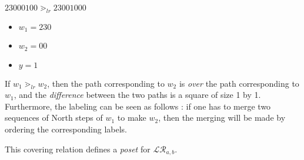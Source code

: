\begin{example}[$a < b : a = 3, b = 5$, third case]
    $23000100 \gtrdot_{lr} 23001000$
    \begin{itemize}
        \item $w_1 = 230$
        \item $w_2 = 00$
        \item $y = 1$
    \end{itemize}
\end{example}

\begin{rem}
    If $w_1 \gtrdot_{lr} w_2$, then the path corresponding to
    $w_2$ is \emph{over} the path corresponding to $w_1$,
    and the \emph{difference} between the two paths is a
    square of size 1 by 1.\\
    Furthermore, the labeling can be seen as follows :
    if one has to merge two sequences of North steps of $w_1$
    to make $w_2$, then the merging will be made by ordering the
    corresponding labels.
\end{rem}

\begin{prop}
    This covering relation defines a \emph{poset}
    for $\mathcal{LR}_{a,b}$.
\end{prop}

